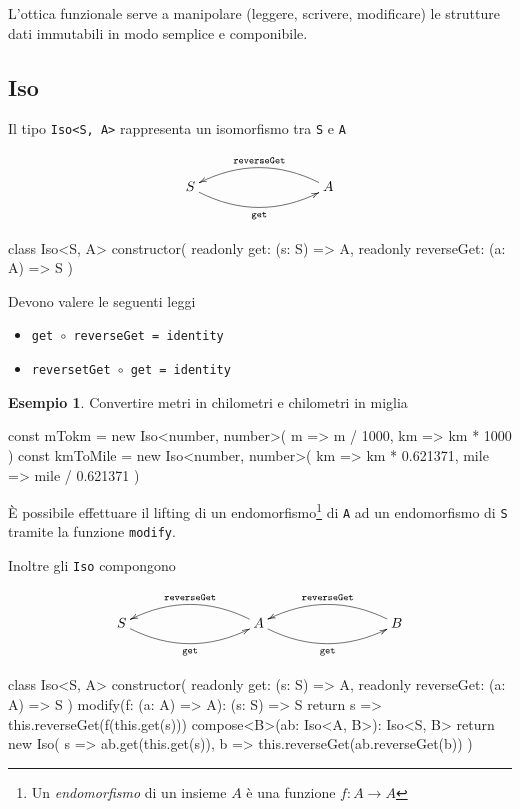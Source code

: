 \documentclass[12pt]{article}
\theoremstyle{definition}
\newtheorem{example}{Esempio}[section]
\newenvironment{code}
  {\vspace{0.5cm} \VerbatimEnvironment\begin{typescriptcode}}
  {\end{typescriptcode} \vspace{0.2cm}}
\begin{document}
L'ottica funzionale serve a manipolare (leggere, scrivere, modificare) le strutture dati immutabili in modo semplice e componibile.

\subsection{Iso}

Il tipo \texttt{Iso<S, A>} rappresenta un isomorfismo tra \texttt{S} e \texttt{A}

\[
\xymatrixrowsep{3cm}
\xymatrixcolsep{3cm}
\xymatrix{
  S \ar@/_0.5cm/[r]_{\texttt{get}} & A \ar@/_0.5cm/[l]_{\texttt{reverseGet}}
}
\]

\begin{code}
class Iso<S, A> {
  constructor(
    readonly get: (s: S) => A,
    readonly reverseGet: (a: A) => S
  ) {}
}
\end{code}

Devono valere le seguenti leggi

\begin{itemize}
  \item \texttt{get $\circ$ reverseGet = identity}
  \item \texttt{reversetGet $\circ$ get = identity}
\end{itemize}

\begin{example}

Convertire metri in chilometri e chilometri in miglia

\begin{code}
const mTokm = new Iso<number, number>(
  m => m / 1000,
  km => km * 1000
)
const kmToMile = new Iso<number, number>(
  km => km * 0.621371,
  mile => mile / 0.621371
)
\end{code}
\end{example}

È possibile effettuare il lifting di un endomorfismo\footnote{Un \emph{endomorfismo} di un insieme $A$ è una funzione $f: A \rightarrow A$}
di \texttt{A} ad un endomorfismo di \texttt{S} tramite la funzione \texttt{modify}.

Inoltre gli \texttt{Iso} compongono

\[
\xymatrixrowsep{3cm}
\xymatrixcolsep{3cm}
\xymatrix{
  S \ar@/_0.5cm/[r]_{\texttt{get}} & A \ar@/_0.5cm/[l]_{\texttt{reverseGet}} \ar@/_0.5cm/[r]_{\texttt{get}} & B \ar@/_0.5cm/[l]_{\texttt{reverseGet}}
}
\]

\begin{code}
class Iso<S, A> {
  constructor(
    readonly get: (s: S) => A,
    readonly reverseGet: (a: A) => S
  ) {}
  modify(f: (a: A) => A): (s: S) => S {
    return s => this.reverseGet(f(this.get(s)))
  }
  compose<B>(ab: Iso<A, B>): Iso<S, B> {
    return new Iso(
      s => ab.get(this.get(s)),
      b => this.reverseGet(ab.reverseGet(b))
    )
  }
}
\end{code}
\end{document}
